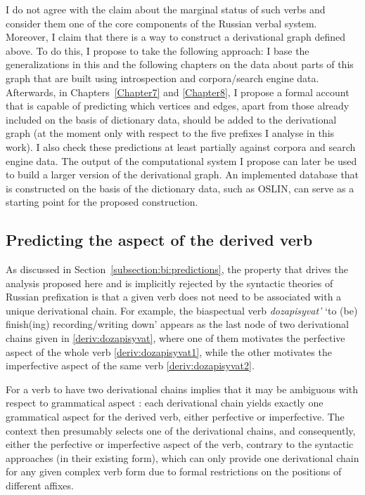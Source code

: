 I do not agree with the claim about the marginal status of such verbs and consider them one of the core components of the Russian verbal system. Moreover, I claim that there is a way to construct a derivational graph defined above. To do this, I propose to take the following approach: I base the generalizations in this and the following chapters on the data about parts of this graph that are built using introspection and corpora/search engine data. Afterwards, in Chapters~\ref{Chapter7} and \ref{Chapter8}, I propose a formal account that is capable of predicting which vertices and edges, apart from those already included on the basis of dictionary data, should be added to the derivational graph (at the moment only with respect to the five prefixes I analyse in this work). I also check these predictions at least partially against corpora and search engine data. The output of the computational system I propose can later be used to build a larger version of the derivational graph. An implemented database that is constructed on the basis of the dictionary data, such as OSLIN, can serve as a starting point for the proposed construction.

\subsection{Predicting the aspect of the derived verb}\label{subsection:predict}
As discussed in Section~\ref{subsection:bi:predictions}, the property that drives the analysis proposed here and is implicitly rejected by the syntactic theories  of Russian prefixation  is that a given verb does not need to be associated with a unique derivational chain. For example, the biaspectual verb  \textit{dozapisyvat'} `to (be) finish(ing) recording/writing down' appears as the last node of two derivational chains given in \ref{deriv:dozapisyvat}, where one of them motivates the perfective aspect of the whole verb \ref{deriv:dozapisyvat1}, while the other motivates the imperfective aspect of the same verb \ref{deriv:dozapisyvat2}.

For a verb to have two derivational chains implies that it may be ambiguous with respect to grammatical aspect : each derivational chain yields exactly one grammatical aspect for the derived verb, either perfective or imperfective. The context   then presumably selects one of the derivational chains, and consequently, either the perfective or imperfective aspect of the verb, contrary to the syntactic approaches (in their existing form), which can only provide one derivational chain for any given complex verb form due to formal restrictions on the positions of different affixes.

